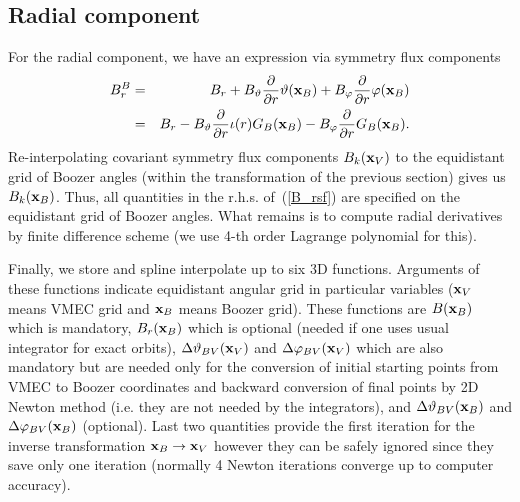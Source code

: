 \documentclass[12pt]{article}
\newcommand{\bea}[1]{\begin{eqnarray} \label{#1}}
\newcommand{\eea}{\end{eqnarray}}
\newcommand{\eq}[1]{(\ref{#1})}
\newcommand{\difp}[2]{\frac{\partial #1}{\partial #2}}
\newcommand{\bx}{{\bf x}}
\begin{document}
\subsection{Radial component}

For the radial component, we have an expression via symmetry flux components
\bea{B_rsf}
B_r^B &=& 
B_r+B_\vartheta\difp{}{r}\vartheta(\bx_B)+B_\varphi\difp{}{r}\varphi(\bx_B)
\nonumber \\
&=&
B_r-B_\vartheta\difp{}{r}\iota(r)G_B(\bx_B)-B_\varphi\difp{}{r}G_B(\bx_B).
\eea
Re-interpolating covariant symmetry flux components $B_k(\bx_V)$ to the equidistant grid of Boozer angles 
(within the transformation of the previous section) gives us $B_k(\bx_B)$. 
Thus, all quantities in the r.h.s. of~\eq{B_rsf} are specified on the equidistant grid of Boozer angles.
What remains is to compute
radial derivatives by finite difference scheme (we use 4-th order Lagrange polynomial for this).

\bigskip
Finally, we store and spline interpolate up to six 3D functions. Arguments of these functions
indicate equidistant angular grid in particular variables ($\bx_V$ means VMEC grid and $\bx_B$ means Boozer grid).
These functions are $B(\bx_B)$ which is mandatory, $B_r(\bx_B)$ which is optional (needed if one uses usual 
integrator for exact orbits), $\Delta \vartheta_{BV}(\bx_V)$ and $\Delta\varphi_{BV}(\bx_V)$ which are also
mandatory but are needed only for the conversion of initial starting points from VMEC to Boozer coordinates
and backward conversion of final points by 2D Newton method (i.e. they are not needed by the integrators), and 
$\Delta \vartheta_{BV}(\bx_B)$ and $\Delta\varphi_{BV}(\bx_B)$ (optional). Last two quantities
provide the first iteration for the inverse transformation $\bx_B\rightarrow\bx_V$ however they can be safely
ignored since they save only one iteration (normally 4 Newton iterations converge up to computer accuracy).
\end{document}

